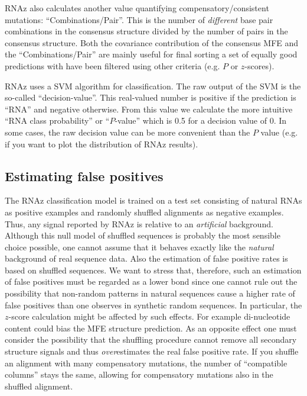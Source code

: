 \documentclass[11pt]{article}
\begin{document}
RNAz also calculates another value quantifying compensatory/consistent
mutations: ``Combinations/Pair''. This is the number of \emph{different}
base pair combinations in the consensus structure divided by the number of
pairs in the consensus structure. Both the covariance contribution of the
consensus MFE and the ``Combinations/Pair'' are mainly useful for final
sorting a set of equally good predictions with have been filtered using
other criteria (e.g. $P$ or $z$-scores).

RNAz uses a SVM algorithm for classification.  The raw output of the SVM is
the so-called ``decision-value''. This real-valued number is positive if
the prediction is ``RNA'' and negative otherwise.  From this value we
calculate the more intuitive ``RNA class probability'' or ``$P$-value''
which is 0.5 for a decision value of 0. In some cases, the raw decision
value can be more convenient than the $P$ value (e.g. if you want to plot
the distribution of RNAz results).

\subsection{Estimating false positives}
\label{sec:estim-false-posit}

The RNAz classification model is trained on a test set consisting of
natural RNAs as positive examples and randomly shuffled alignments as
negative examples. Thus, any signal reported by RNAz is relative to an
\emph{artificial} background. Although this null model of shuffled
sequences is probably the most sensible choice possible, one cannot assume
that it behaves exactly like the \emph{natural} background of real sequence
data. Also the estimation of false positive rates is based on shuffled
sequences. We want to stress that, therefore, such an estimation of false
positives must be regarded as a lower bond since one cannot rule out the
possibility that non-random patterns in natural sequences cause a higher
rate of false positives than one observes in synthetic random sequences. In
particular, the $z$-score calculation might be affected by such effects.
For example di-nucleotide content could bias the MFE structure prediction.
As an opposite effect one must consider the possibility that the shuffling
procedure cannot remove all secondary structure signals and thus
\emph{over}estimates the real false positive rate. If you shuffle an
alignment with many compensatory mutations, the number of ``compatible
columns'' stays the same, allowing for compensatory mutations also in the
shuffled alignment.
\end{document}
